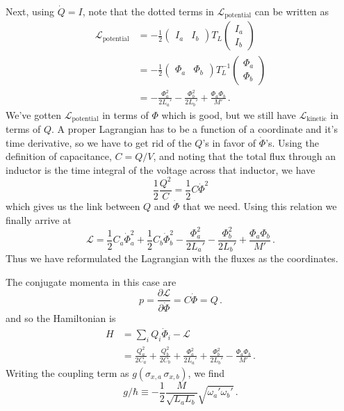 Next, using $\dot{Q}=I$, note that the dotted terms in $\mathcal{L}_\text{potential}$ can be written as
\begin{align*}
  \mathcal{L}_\text{potential}
  &= -\frac{1}{2}
    \begin{pmatrix} I_a & I_b \end{pmatrix} T_L \begin{pmatrix} I_a \\ I_b \end{pmatrix} \\
  &= -\frac{1}{2}
    \begin{pmatrix} \Phi_a & \Phi_b \end{pmatrix}
    T_L^{-1}
    \begin{pmatrix} \Phi_a \\ \Phi_b \end{pmatrix} \\
  &= - \frac{\Phi_a^2}{2 L_a'} - \frac{\Phi_b^2}{2 L_b'} + \frac{\Phi_a \Phi_b}{M'}
  \, .
\end{align*}
We've gotten $\mathcal{L}_\text{potential}$ in terms of $\Phi$ which is good, but we still have $\mathcal{L}_\text{kinetic}$ in terms of $Q$.
A proper Lagrangian has to be a function of a coordinate and it's time derivative, so we have to get rid of the $Q$'s in favor of $\dot \Phi$'s.
Using the definition of capacitance, $C = Q/V$, and noting that the total flux through an inductor is the time integral of the voltage across that inductor, we have
\begin{equation*}
  \frac{1}{2}\frac{Q^2}{C} = \frac{1}{2}C \dot{\Phi}^2
\end{equation*}
which gives us the link between $Q$ and $\dot \Phi$ that we need.
Using this relation we finally arrive at
\begin{equation*}
  \mathcal{L} =
  \frac{1}{2}C_a \dot{\Phi}_a^2 + \frac{1}{2}C_b \dot{\Phi}_b^2
  - \frac{\Phi_a^2}{2L_a'} - \frac{\Phi_b^2}{2L_b'}
  + \frac{\Phi_a \Phi_b}{M'}
  \, .
\end{equation*}
Thus we have reformulated the Lagrangian with the fluxes as the coordinates.

The conjugate momenta in this case are
\begin{equation}
  p = \frac{\partial \mathcal{L}}{\partial \dot{\Phi}} = C \dot{\Phi} = Q \, .
\end{equation}
and so the Hamiltonian is
\begin{align}
  H
  &= \sum_i Q_i \dot{\Phi}_i - \mathcal{L} \nonumber \\
  &=
    \frac{Q_a^2}{2 C_a} + \frac{Q_b^2}{2 C_b}
    + \frac{\Phi_a^2}{2L_a'} + \frac{\Phi_b^2}{2L_b'}
    - \frac{\Phi_a \Phi_b}{M'}
  \, .
\end{align}
Writing the coupling term as $g (\sigma_{x,a} \, \sigma_{x,b})$, we find
\begin{equation}
  g/\hbar \equiv - \frac{1}{2} \frac{M}{\sqrt{L_a L_b}} \sqrt{\omega_a' \omega_b'}
  \, .
\end{equation}
